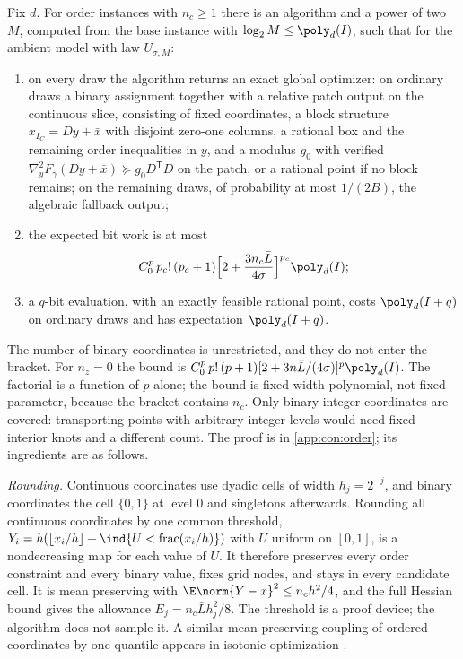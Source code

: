 \begin{theorem}\label{thm:con:order}
Fix $d$. For order instances with $n_c\ge1$ there is an algorithm and a
power of two $M$, computed from the base instance with
$\log_2M\le\poly_d(I)$, such that for the ambient model with law
$U_{\sigma,M}$:
\begin{enumerate}[label=(\roman*)]
\item on every draw the algorithm returns an exact global optimizer: on
ordinary draws a binary assignment together with a relative patch output on
the continuous slice, consisting of fixed coordinates, a block structure
$x_{I_C}=Dy+\bar x$ with disjoint zero-one columns, a rational box and the
remaining order inequalities in $y$, and a modulus $g_0$ with verified
$\nabla^2_yF_\gamma(Dy+\bar x)\succeq g_0D^{\mathsf T}D$ on the patch, or a
rational point if no block remains; on the
remaining draws, of probability at most $1/(2B)$, the algebraic fallback
output;
\item the expected bit work is at most
\begin{equation}\label{eq:con:orderbound}
 C_0^p\,p_c!\,(p_c+1)\Bigl[2+\frac{3n_c\bar L}{4\sigma}\Bigr]^{p_c}\poly_d(I);
\end{equation}
\item a $q$-bit evaluation, with an exactly feasible rational point, costs
$\poly_d(I+q)$ on ordinary draws and has expectation $\poly_d(I+q)$.
\end{enumerate}
\end{theorem}

The number of binary coordinates is unrestricted, and they do not enter the
bracket. For $n_z=0$ the bound is
$C_0^p\,p!\,(p+1)[2+3n\bar L/(4\sigma)]^p\poly_d(I)$. The factorial is a
function of $p$ alone; the bound is fixed-width polynomial, not
fixed-parameter, because the bracket contains $n_c$. Only binary integer
coordinates are covered: transporting points with arbitrary integer levels
would need fixed interior knots and a different count. The proof is in
\cref{app:con:order}; its ingredients are as follows.

\emph{Rounding.} Continuous coordinates use dyadic cells of width
$h_j=2^{-j}$, and binary coordinates the cell $\{0,1\}$ at level $0$ and
singletons afterwards. Rounding all continuous coordinates by one common
threshold, $Y_i=h(\lfloor x_i/h\rfloor+\ind\{U<\operatorname{frac}(x_i/h)\})$
with $U$ uniform on $[0,1]$, is a nondecreasing map for each value of $U$.
It therefore preserves every order constraint and every binary value, fixes
grid nodes, and stays in every candidate cell. It is mean preserving with
$\E\norm{Y-x}^2\le n_ch^2/4$, and the full Hessian bound gives the allowance
$E_j=n_c\bar Lh_j^2/8$. The threshold is a proof device; the algorithm does
not sample it. A similar mean-preserving coupling of ordered coordinates by
one quantile appears in isotonic optimization \citep{bach2018-efficient-algorithms-for-non-convex}.

